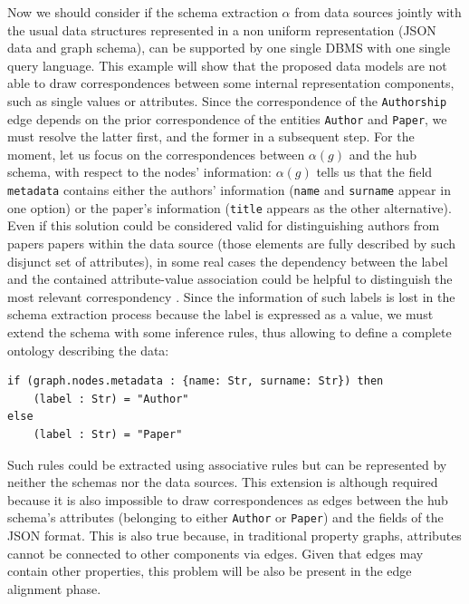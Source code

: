 \begin{example}[label=ex:examplegraphdata]
Now we should consider if the schema extraction $\alpha$ from data sources jointly with the usual data structures represented in a non uniform representation (JSON data and graph schema), can be supported by one single DBMS with one single query language. This example will show that the proposed data models are not able to draw correspondences between some internal representation components, such as single values or attributes.  %
Since the correspondence of the \texttt{Authorship} edge depends on the prior correspondence of the entities \texttt{Author} and \texttt{Paper}, we must resolve the latter first, and the former in a subsequent step. For the moment, let us focus on the correspondences between $\alpha(g)$ and the hub schema, with respect to the nodes' information: $\alpha(g)$ tells us that the field \texttt{metadata} contains either the authors' information (\texttt{name} and \texttt{surname} appear in one option) or the paper's information (\texttt{title} appears as the other alternative). Even if this solution could be considered valid for distinguishing authors from papers papers within the data source (those elements are fully described by such disjunct set of attributes), in some real cases the dependency between the label and the contained attribute-value association could be helpful to distinguish the most relevant correspondency \cite{IBMWatson}. Since the information of such labels is lost in the schema extraction process because the label  is expressed as a value,  we must extend the schema with some inference rules, thus allowing to define a complete ontology describing the data:
\begin{lstlisting}[language=theoryjson,basicstyle=\ttfamily\small]
if (graph.nodes.metadata : {name: Str, surname: Str}) then
	(label : Str) = "Author"
else
	(label : Str) = "Paper"
\end{lstlisting}
Such rules could be extracted using associative rules \cite{Tan05} but can be represented by neither the schemas nor the data sources. This extension  is although required because it is also impossible to draw correspondences as edges between the hub schema's attributes (belonging to either \texttt{Author} or \texttt{Paper}) and the fields of the JSON format. This is also true because, in  traditional property graphs, attributes cannot be connected to other components via edges. Given that edges may contain other properties, this problem will be also be present in the edge alignment phase.


\end{example}
